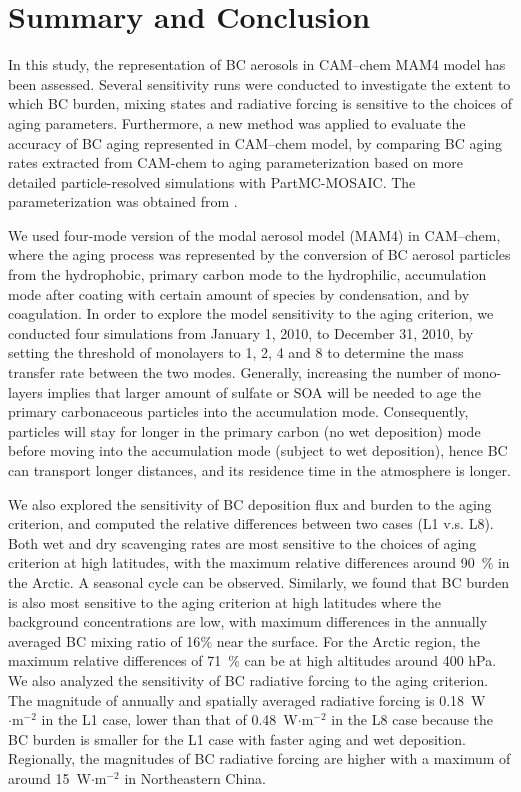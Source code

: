 \documentclass[12pt, fullpage]{uiucthesis2009}
\begin{document}
	
	\chapter{Summary and Conclusion}
		In this study, the representation of BC aerosols in CAM--chem MAM4 model has been assessed. Several sensitivity runs were conducted to investigate the extent to which BC burden, mixing states and radiative forcing is sensitive to the choices of aging parameters. Furthermore, a new method was applied to evaluate the accuracy of BC aging represented in CAM--chem model, by comparing BC aging rates extracted from CAM-chem to aging parameterization based on more detailed particle-resolved simulations with PartMC-MOSAIC. The parameterization was obtained from \citet{Fierce2016}. 
		
		We used four-mode version of the modal aerosol model (MAM4) in CAM--chem, where the aging process was represented by the conversion of BC aerosol particles from the hydrophobic, primary carbon mode to the hydrophilic, accumulation mode after coating with certain amount of species by condensation, and by coagulation. In order to explore the model sensitivity to the aging criterion, we conducted four simulations from January 1, 2010, to December 31, 2010, by setting the threshold of monolayers to 1, 2, 4 and 8 to determine the mass transfer rate between the two modes. Generally, increasing the number of mono-layers implies that larger amount of sulfate or SOA will be needed to age the primary carbonaceous particles into the accumulation mode. Consequently, particles will stay for longer in the primary carbon (no wet deposition) mode before moving into the accumulation mode (subject to wet deposition), hence BC can transport longer distances, and its residence time in the atmosphere is longer. 
		
		We also explored the sensitivity of BC deposition flux and burden to the aging criterion, and computed the relative differences between two cases (L1 v.s. L8). Both wet and dry scavenging rates are most sensitive to the choices of aging criterion at high latitudes, with the maximum relative differences around 90~$\%$ in the Arctic. A seasonal cycle can be observed. Similarly, we found that BC burden is also most sensitive to the aging criterion at high latitudes where the background concentrations are low, with maximum differences in the annually averaged BC mixing ratio of 16$\%$ near the surface. For the Arctic region, the maximum relative differences of 71~$\%$ can be at high altitudes around 400 hPa. We also analyzed the sensitivity of BC radiative forcing to the aging criterion. The magnitude of annually and spatially averaged radiative forcing is 0.18~W$\cdot{\text{m}^{-2}}$ in the L1 case, lower than that of 0.48~W$\cdot{\text{m}^{-2}}$ in the L8 case because the BC burden is smaller for the L1 case with faster aging and wet deposition. Regionally, the magnitudes of BC radiative forcing are higher with a maximum of around 15~W$\cdot{\text{m}^{-2}}$ in Northeastern China. 
\end{document}
